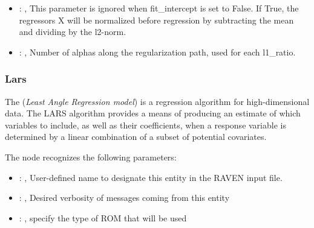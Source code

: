 \begin{itemize}
    \item {}: , 
      This parameter is ignored when fit\_intercept is set to False. If True,
      the regressors X will be normalized before regression by subtracting the mean and
      dividing by the l2-norm.

    \item {}: , 
      Number of alphas along the regularization path,
      used for each l1\_ratio.
  \end{itemize}


\subsubsection{Lars}
  The  (\textit{Least Angle Regression model})                         is a regression
  algorithm for high-dimensional data.                         The LARS algorithm provides a means
  of producing an estimate of which variables                         to include, as well as their
  coefficients, when a response variable is                         determined by a linear
  combination of a subset of potential covariates.

  The  node recognizes the following parameters:
    \begin{itemize}
      \item {}: , 
        User-defined name to designate this entity in the RAVEN input file.
      \item {}: , 
        Desired verbosity of messages coming from this entity
      \item {}: , 
        specify the type of ROM that will be used
  \end{itemize}

